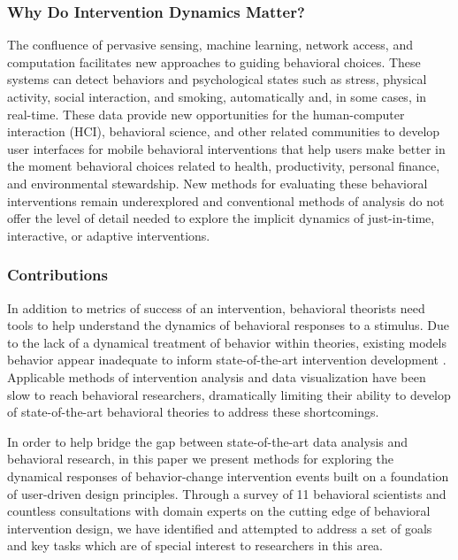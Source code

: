 \subsubsection{Why Do Intervention Dynamics Matter?}
The confluence of pervasive sensing, machine learning, network access, and computation facilitates new approaches to guiding behavioral choices. 
These systems can detect behaviors and psychological states such as stress\cite{chang2011,lu2012}, physical activity\cite{li2010,emken2012}, social interaction\cite{wyatt2011}, and smoking\cite{sazonov2011}, automatically and, in some cases, in real-time.
These data provide new opportunities for the human-computer interaction (HCI), behavioral science, and other related communities to develop user interfaces for mobile behavioral interventions that help users make better in the moment behavioral choices related to health\cite{klasnja2012,nahum2012}, productivity\cite{ho2005,sohn2005,jewell2011}, personal finance\cite{gallego2012}, and environmental stewardship.\cite{elliott2012}
New methods for evaluating these behavioral interventions remain underexplored and conventional methods of analysis do not offer the level of detail needed to explore the implicit dynamics of just-in-time, interactive, or adaptive interventions.

\subsubsection{Contributions}
In addition to metrics of success of an intervention, behavioral theorists need tools to help understand the dynamics of behavioral responses to a stimulus.
Due to the lack of a dynamical treatment of behavior within theories, existing models behavior appear inadequate to inform state-of-the-art intervention development \cite{riley2011}.
Applicable methods of intervention analysis and data visualization have been slow to reach behavioral researchers, dramatically limiting their ability to develop of state-of-the-art behavioral theories to address these shortcomings.

In order to help bridge the gap between state-of-the-art data analysis and behavioral research, in this paper we present methods for exploring the dynamical responses of behavior-change intervention events built on a foundation of user-driven design principles.
Through a survey of 11 behavioral scientists and countless consultations with domain experts on the cutting edge of behavioral intervention design, we have identified and attempted to address a set of goals and key tasks which are of special interest to researchers in this area. 

